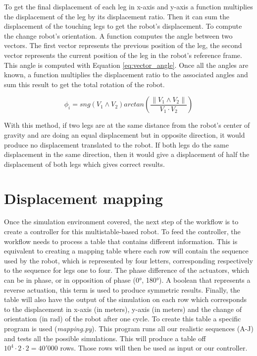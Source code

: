             To get the final displacement of each leg in x-axis and y-axis a function multiplies the displacement of the leg by its displacement ratio. Then it can sum the displacement of the touching legs to get the robot's displacement.
            To compute the change robot's orientation. A function computes the angle between two vectors. The first vector represents the previous position of the leg, the second vector represents the current position of the leg in the robot's reference frame. This angle is computed with Equation \ref{eq:vector_angle}. Once all the angles are known, a function multiplies the displacement ratio to the associated angles and sum this result to get the total rotation of the robot.

            \begin{equation}
                \phi_i = sng(V_1 \wedge V_2) arctan\left(\frac{\lVert V_1 \wedge V_2 \rVert}{V_1 \cdot V_2}\right)
                \label{eq:vector_angle}
            \end{equation}
            
            With this method, if two legs are at the same distance from the robot's center of gravity and are doing an equal displacement but in opposite direction, it would produce no displacement translated to the robot. If both legs do the same displacement in the same direction, then it would give a displacement of half the displacement of both legs which gives correct results.

    \section{Displacement mapping}
        Once the simulation environment covered, the next step of the workflow is to create a controller for this multistable-based robot. To feed the controller, the workflow needs to process a table that contains different information. This is equivalent to creating a mapping table where each row will contain the sequence used by the robot, which is represented by four letters, corresponding respectively to the sequence for legs one to four. The phase difference of the actuators, which can be in phase, or in opposition of phase (0°, 180°). A boolean that represents a reverse actuation, this term is used to produce symmetric results. Finally, the table will also have the output of the simulation on each row which corresponds to the displacement in x-axis (in meters), y-axis (in meters) and the change of orientation (in rad) of the robot after one cycle. 
        To create this table a specific program is used (\textit{mapping.py}). This program runs all our realistic sequences (A-J) and tests all the possible simulations. This will produce a table off $10^4 \cdot 2 \cdot 2 = 40'000$ rows. Those rows will then be used as input or our controller.
        

